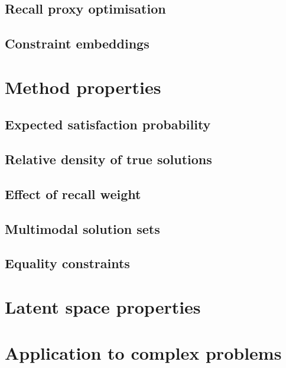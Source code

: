 \documentclass[../../main.tex]{subfiles}
\begin{document}
\subsection{Recall proxy optimisation}
\subsection{Constraint embeddings}

\section{Method properties}
\subsection{Expected satisfaction probability}
\subsection{Relative density of true solutions}
\subsection{Effect of recall weight}
\subsection{Multimodal solution sets}
\subsection{Equality constraints}

\section{Latent space properties}

\section{Application to complex problems}
\end{document}
